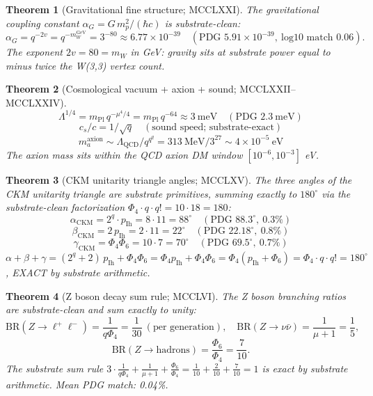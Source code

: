 \documentclass[11pt]{article}
\newtheorem{theorem}{Theorem}[section]
\begin{document}
\begin{theorem}[Gravitational fine structure; MCCLXXI]\label{thm:alpha_G}
The gravitational coupling constant
$\alpha_G = G\,m_p^2/(\hbar c)$ is substrate-clean:
\[
  \alpha_G = q^{-2v} = q^{-m_W^{\text{GeV}}} = 3^{-80} \approx 6.77\times 10^{-39}
  \quad (\text{PDG } 5.91\times 10^{-39},\ \text{log10 match } 0.06).
\]
The exponent $2v = 80 = m_W$ in GeV: gravity sits at substrate
power equal to minus twice the W(3,3) vertex count.
\end{theorem}

\begin{theorem}[Cosmological vacuum + axion + sound; MCCLXXII--MCCLXXIV]\label{thm:cosmo_extras}
\[
  \Lambda^{1/4} = m_{\mathrm{Pl}}\,q^{-\mu^4/4} = m_{\mathrm{Pl}}\,q^{-64}
                \approx 3~\text{meV} \quad (\text{PDG } 2.3~\text{meV})
\]
\[
  c_s/c = 1/\sqrt{q} \quad (\text{sound speed; substrate-exact})
\]
\[
  m_a^{\text{axion}} \sim \Lambda_{\mathrm{QCD}}/q^{q^q} = 313~\text{MeV}/3^{27} \sim 4\times 10^{-5}~\text{eV}
\]
The axion mass sits within the QCD axion DM window $[10^{-6},10^{-3}]$ eV.
\end{theorem}

\begin{theorem}[CKM unitarity triangle angles; MCCLXV]\label{thm:ckm_triangle}
The three angles of the CKM unitarity triangle are substrate primitives,
summing exactly to $180^\circ$ via the substrate-clean factorization
$\Phi_4\cdot q\cdot q! = 10 \cdot 18 = 180$:
\[
  \alpha_{\mathrm{CKM}} = 2^q\cdot p_{\mathrm{Ih}} = 8\cdot 11 = 88^\circ
  \quad (\text{PDG } 88.3^\circ,\ 0.3\%)
\]
\[
  \beta_{\mathrm{CKM}}  = 2\,p_{\mathrm{Ih}} = 2\cdot 11 = 22^\circ
  \quad (\text{PDG } 22.18^\circ,\ 0.8\%)
\]
\[
  \gamma_{\mathrm{CKM}} = \Phi_4\Phi_6 = 10\cdot 7 = 70^\circ
  \quad (\text{PDG } 69.5^\circ,\ 0.7\%)
\]
$\alpha + \beta + \gamma = (2^q+2)\,p_{\mathrm{Ih}} + \Phi_4\Phi_6
 = \Phi_4 p_{\mathrm{Ih}} + \Phi_4\Phi_6
 = \Phi_4(p_{\mathrm{Ih}}+\Phi_6) = \Phi_4\cdot q\cdot q!
 = 180^\circ$, EXACT by substrate arithmetic.
\end{theorem}

\begin{theorem}[Z boson decay sum rule; MCCLVI]\label{thm:Z_sum_rule}
The Z boson branching ratios are substrate-clean and sum exactly to unity:
\[
  \mathrm{BR}(Z\to \ell^+\ell^-) = \frac{1}{q\Phi_4} = \frac{1}{30}\ (\text{per generation}),\quad
  \mathrm{BR}(Z\to \nu\bar\nu) = \frac{1}{\mu+1} = \frac{1}{5},
\]
\[
  \mathrm{BR}(Z\to \mathrm{hadrons}) = \frac{\Phi_6}{\Phi_4} = \frac{7}{10}.
\]
The substrate sum rule
$3\cdot\frac{1}{q\Phi_4} + \frac{1}{\mu+1} + \frac{\Phi_6}{\Phi_4} = \frac{1}{10}+\frac{2}{10}+\frac{7}{10} = 1$
is exact by substrate arithmetic.  Mean PDG match: 0.04\%.
\end{theorem}
\end{document}
